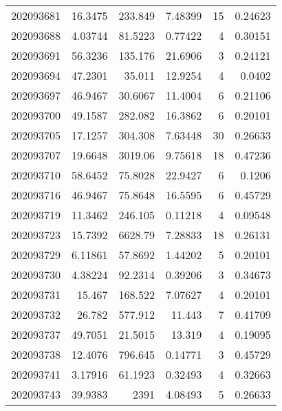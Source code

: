 \begin{tabular}{rrrrrr}
 202093681 &         16.3475  &      233.849  &            7.48399 &          15 & 0.24623 \\
 202093688 &          4.03744 &       81.5223 &            0.77422 &           4 & 0.30151 \\
 202093691 &         56.3236  &      135.176  &           21.6906  &           3 & 0.24121 \\
 202093694 &         47.2301  &       35.011  &           12.9254  &           4 & 0.0402  \\
 202093697 &         46.9467  &       30.6067 &           11.4004  &           6 & 0.21106 \\
 202093700 &         49.1587  &      282.082  &           16.3862  &           6 & 0.20101 \\
 202093705 &         17.1257  &      304.308  &            7.63448 &          30 & 0.26633 \\
 202093707 &         19.6648  &     3019.06   &            9.75618 &          18 & 0.47236 \\
 202093710 &         58.6452  &       75.8028 &           22.9427  &           6 & 0.1206  \\
 202093716 &         46.9467  &       75.8648 &           16.5595  &           6 & 0.45729 \\
 202093719 &         11.3462  &      246.105  &            0.11218 &           4 & 0.09548 \\
 202093723 &         15.7392  &     6628.79   &            7.28833 &          18 & 0.26131 \\
 202093729 &          6.11861 &       57.8692 &            1.44202 &           5 & 0.20101 \\
 202093730 &          4.38224 &       92.2314 &            0.39206 &           3 & 0.34673 \\
 202093731 &         15.467   &      168.522  &            7.07627 &           4 & 0.20101 \\
 202093732 &         26.782   &      577.912  &           11.443   &           7 & 0.41709 \\
 202093737 &         49.7051  &       21.5015 &           13.319   &           4 & 0.19095 \\
 202093738 &         12.4076  &      796.645  &            0.14771 &           3 & 0.45729 \\
 202093741 &          3.17916 &       61.1923 &            0.32493 &           4 & 0.32663 \\
 202093743 &         39.9383  &     2391      &            4.08493 &           5 & 0.26633 \\

\end{tabular}

